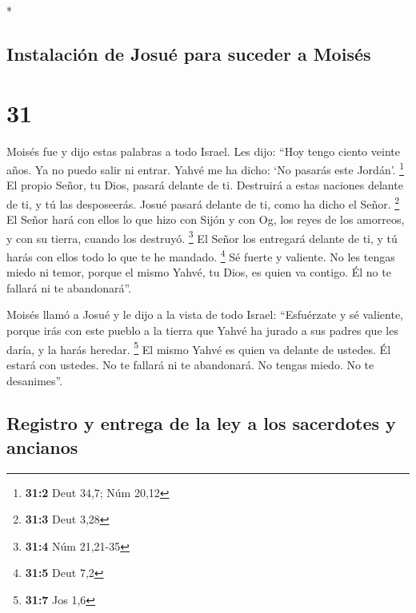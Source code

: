 \begin{paracol}{2}
\switchcolumn[0]*

\hypertarget{instalaciuxf3n-de-josuuxe9-para-suceder-a-moisuxe9s}{%
\subsection{Instalación de Josué para suceder a
Moisés}\label{instalaciuxf3n-de-josuuxe9-para-suceder-a-moisuxe9s}}

\hypertarget{section-60}{%
\section{31}\label{section-60}}

 Moisés fue y dijo estas palabras a todo Israel.
 Les dijo: ``Hoy tengo ciento veinte años. Ya no puedo
salir ni entrar. Yahvé me ha dicho: `No pasarás este Jordán'.
\footnote{\textbf{31:2} Deut 34,7; Núm 20,12}  El propio
Señor, tu Dios, pasará delante de ti. Destruirá a estas naciones delante
de ti, y tú las desposeerás. Josué pasará delante de ti, como ha dicho
el Señor. \footnote{\textbf{31:3} Deut 3,28}  El Señor
hará con ellos lo que hizo con Sijón y con Og, los reyes de los
amorreos, y con su tierra, cuando los destruyó. \footnote{\textbf{31:4}
  Núm 21,21-35}  El Señor los entregará delante de ti, y
tú harás con ellos todo lo que te he mandado. \footnote{\textbf{31:5}
  Deut 7,2}  Sé fuerte y valiente. No les tengas miedo ni
temor, porque el mismo Yahvé, tu Dios, es quien va contigo. Él no te
fallará ni te abandonará''.

 Moisés llamó a Josué y le dijo a la vista de todo Israel:
``Esfuérzate y sé valiente, porque irás con este pueblo a la tierra que
Yahvé ha jurado a sus padres que les daría, y la harás heredar.
\footnote{\textbf{31:7} Jos 1,6}  El mismo Yahvé es quien
va delante de ustedes. Él estará con ustedes. No te fallará ni te
abandonará. No tengas miedo. No te desanimes''.

\hypertarget{registro-y-entrega-de-la-ley-a-los-sacerdotes-y-ancianos}{%
\subsection{Registro y entrega de la ley a los sacerdotes y
ancianos}\label{registro-y-entrega-de-la-ley-a-los-sacerdotes-y-ancianos}}


\end{paracol}
